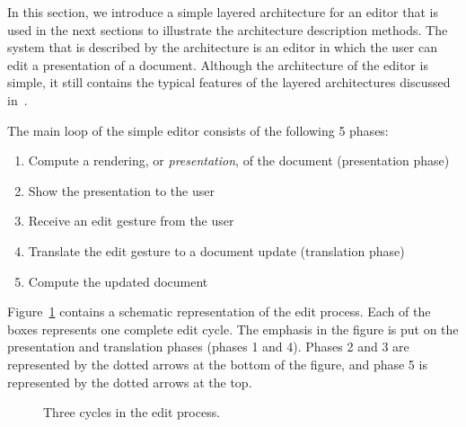 In this section, we introduce a simple layered architecture for an editor that is used in the next sections to illustrate the architecture description methods. The system that is described by the architecture is an editor in which the user can edit a presentation of a document. Although the architecture of the editor is simple, it still contains the typical features of the layered architectures discussed in~\cite{architecture}. 


The main loop of the simple editor consists of the following 5 phases: 
 \begin{enumerate}
 \item Compute a rendering, or {\it presentation}, of the document   (presentation phase)
 \item Show the presentation to the user
 \item Receive an edit gesture from the user
 \item Translate the edit gesture to a document update (translation   phase)
 \item Compute the updated document
 \end{enumerate}

Figure~\ref{simpleeditprocess} contains a schematic representation of the edit process. Each of the boxes represents one complete edit cycle. The emphasis in the figure is put on the presentation and translation phases (phases 1 and 4). Phases 2 and 3 are represented by the dotted arrows at the bottom of the figure, and phase 5 is represented by the dotted arrows at the top.

\begin{figure}
\begin{small}
\begin{center}
\begin{center}
\begin{scriptsize}
\end{scriptsize}
\end{center}\caption{Three cycles in the edit process.}\label{simpleeditprocess} 
\end{center}
\end{small}
\end{figure}

